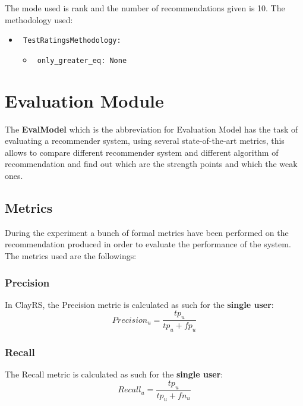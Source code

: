 \documentclass[11pt]{article}
\begin{document}
\hfill\break
The mode used is rank and the number of recommendations given
is 10.
The methodology used:
\begin{itemize}
    \item \verb| TestRatingsMethodology:|
    \begin{itemize}
                    \item \verb| only_greater_eq: None |
            \end{itemize}
\end{itemize}
\hfill\break






\section{Evaluation Module}\label{sec:eva-module}
The \textbf{EvalModel} which is the abbreviation for Evaluation Model has the task of evaluating a recommender system,
using several state-of-the-art metrics, this allows to compare different recommender system and different algorithm of
recommendation and find out which are the strength points and which the weak ones.

\subsection{Metrics}\label{subsec:metrics}
During the experiment a bunch of formal metrics have been performed on the recommendation produced in order to evaluate
the performance of the system.
The metrics used are the followings:
\hfill\break
\hfill\break

\subsubsection{Precision}\label{subsubsec:precision}
In ClayRS, the Precision metric is calculated as such for the \textbf{single user}:
\hfill\break
\hfill\break
    \[
         Precision_u = \frac{tp_u}{tp_u + fp_u}
    \]


\subsubsection{Recall}\label{subsubsec:recall}
The Recall metric is calculated as such for the \textbf{single user}:
\hfill\break
\hfill\break
    \[
        Recall_u = \frac{tp_u}{tp_u + fn_u}
    \]
\end{document}
